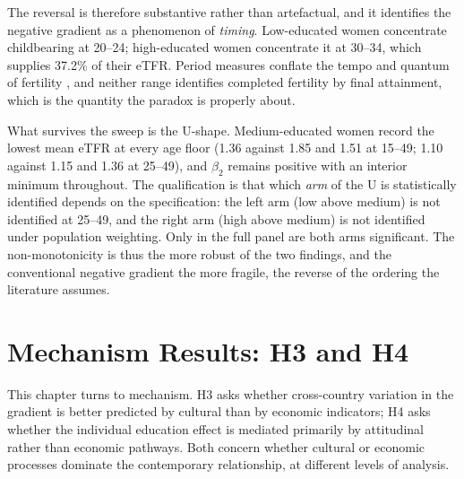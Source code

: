 \documentclass[12pt,a4paper]{report}
\begin{document}
The reversal is therefore substantive rather than artefactual, and it identifies the negative
gradient as a phenomenon of \emph{timing}. Low-educated women concentrate childbearing at 20--24;
high-educated women concentrate it at 30--34, which supplies 37.2\% of their eTFR. Period measures
conflate the tempo and quantum of fertility \citep{bongaartsfeeney1998,kohlerphilipov2001}, and
neither range identifies completed fertility by final attainment, which is the quantity the
paradox is properly about.

What survives the sweep is the U-shape. Medium-educated women record the lowest mean eTFR at every
age floor (1.36 against 1.85 and 1.51 at 15--49; 1.10 against 1.15 and 1.36 at 25--49), and
$\beta_2$ remains positive with an interior minimum throughout. The qualification is that which
\emph{arm} of the U is statistically identified depends on the specification: the left arm
(low above medium) is not identified at 25--49, and the right arm (high above medium) is not
identified under population weighting. Only in the full panel are both arms significant. The
non-monotonicity is thus the more robust of the two findings, and the conventional negative gradient
the more fragile, the reverse of the ordering the literature assumes.

\chapter{Mechanism Results: H3 and H4}

This chapter turns to mechanism. H3 asks whether cross-country variation in the gradient is better
predicted by cultural than by economic indicators; H4 asks whether the individual education effect is
mediated primarily by attitudinal rather than economic pathways. Both concern whether cultural or
economic processes dominate the contemporary relationship, at different levels of analysis.
\end{document}
